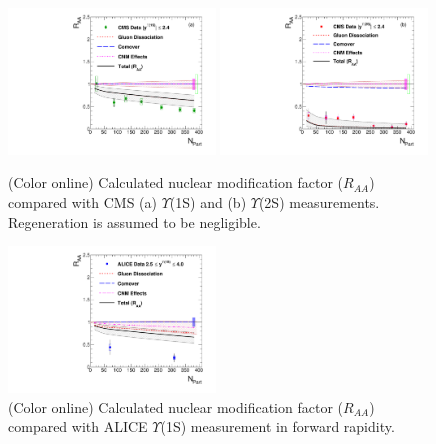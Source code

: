 {  
  \begin{figure}
    \includegraphics[width=0.49\textwidth]{Figures/Quarkonia_276TeV/Fig8a_CMS_Y1SRAANPart.pdf}
    \includegraphics[width=0.49\textwidth]{Figures/Quarkonia_276TeV/Fig8b_CMS_Y2SRAANPart.pdf}
    \caption{(Color online) Calculated nuclear modification factor ($R_{AA}$) compared with CMS 
      (a) $\Upsilon$(1S) and (b) $\Upsilon$(2S) measurements. Regeneration is assumed to be negligible. }
    \label{fig:UpsilonRaa}
  \end{figure}
  \begin{figure}
    \includegraphics[width=0.49\textwidth]{Figures/Quarkonia_276TeV/Fig9_ALICE_Y1SRAANPart.pdf}
    \caption{(Color online) Calculated nuclear modification factor ($R_{AA}$) compared with 
      ALICE $\Upsilon$(1S) measurement in forward rapidity.}
    \label{fig:ALICERaaY}
  \end{figure}




}
